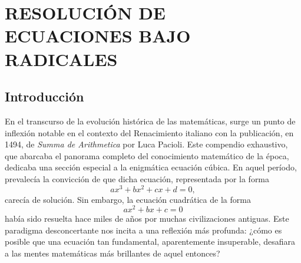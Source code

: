 \chapter[RESOLUCIÓN DE ECUACIONES BAJO RADICALES]{RESOLUCIÓN DE \\ ECUACIONES BAJO \\ RADICALES}\label{sec:radical}
\printchaptertableofcontents

\section{Introducción}

En el transcurso de la evolución histórica de las matemáticas, surge un punto de inflexión notable en el contexto del Renacimiento italiano con la publicación, en 1494, de \textit{Summa de Arithmetica} por Luca Pacioli. Este compendio exhaustivo, que abarcaba el panorama completo del conocimiento matemático de la época, dedicaba una sección especial a la enigmática ecuación cúbica. En aquel período, prevalecía la convicción de que dicha ecuación, representada por la forma
$$ax^3+bx^2+cx+d=0,$$
carecía de solución. Sin embargo, la ecuación cuadrática de la forma
$$ax^2 + bx + c = 0$$
había sido resuelta hace miles de años por muchas civilizaciones antiguas. Este paradigma desconcertante nos incita a una reflexión más profunda: ¿cómo es posible que una ecuación tan fundamental, aparentemente insuperable, desafiara a las mentes matemáticas más brillantes de aquel entonces? %

\newpage

